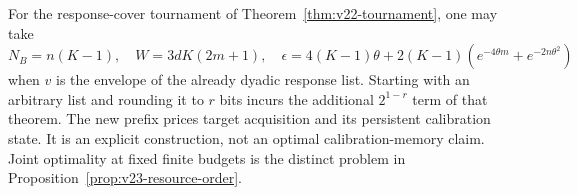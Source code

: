 For the response-cover tournament of Theorem~\ref{thm:v22-tournament},
one may take
\[
 N_B=n(K-1),\quad W=3dK(2m+1),\quad
 \epsilon=4(K-1)\theta+2(K-1)
                         (e^{-4\theta m}+e^{-2n\theta^2})
\]
when $v$ is the envelope of the already dyadic response list. Starting
with an arbitrary list and rounding it to $r$ bits incurs the additional
$2^{1-r}$ term of that theorem. The new prefix prices target acquisition
and its persistent calibration state. It is an explicit construction,
not an optimal calibration-memory claim. Joint optimality at fixed
finite budgets is the distinct problem in
Proposition~\ref{prop:v23-resource-order}.
